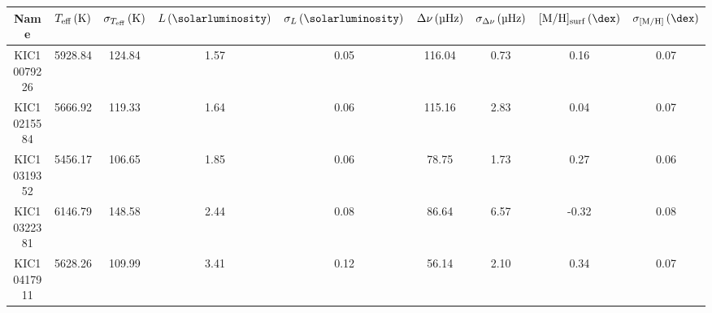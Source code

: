 \begin{tabular}{ccccccccc}
\toprule
\textbf{Name} & $T_\mathrm{eff}\,(\si{\kelvin})$ & $\sigma_{T_\mathrm{eff}}\,(\si{\kelvin})$ & $L\,(\si{\solarluminosity})$ & $\sigma_L\,(\si{\solarluminosity})$ & $\Delta\nu\,(\si{\micro\hertz})$ & $\sigma_{\Delta\nu}\,(\si{\micro\hertz})$ & $\metallicity_\mathrm{surf}\,(\si{\dex})$ & $\sigma_{\metallicity}\,(\si{\dex})$ \\
\midrule
  KIC10079226 &                 5928.84 &                           124.84 &                         1.57 &                                0.05 &                      116.04 &                                 0.73 &                                      0.16 &                                 0.07 \\
  KIC10215584 &                 5666.92 &                           119.33 &                         1.64 &                                0.06 &                      115.16 &                                 2.83 &                                      0.04 &                                 0.07 \\
  KIC10319352 &                 5456.17 &                           106.65 &                         1.85 &                                0.06 &                       78.75 &                                 1.73 &                                      0.27 &                                 0.06 \\
  KIC10322381 &                 6146.79 &                           148.58 &                         2.44 &                                0.08 &                       86.64 &                                 6.57 &                                     -0.32 &                                 0.08 \\
  KIC10417911 &                 5628.26 &                           109.99 &                         3.41 &                                0.12 &                       56.14 &                                 2.10 &                                      0.34 &                                 0.07 \\
\bottomrule
\end{tabular}
